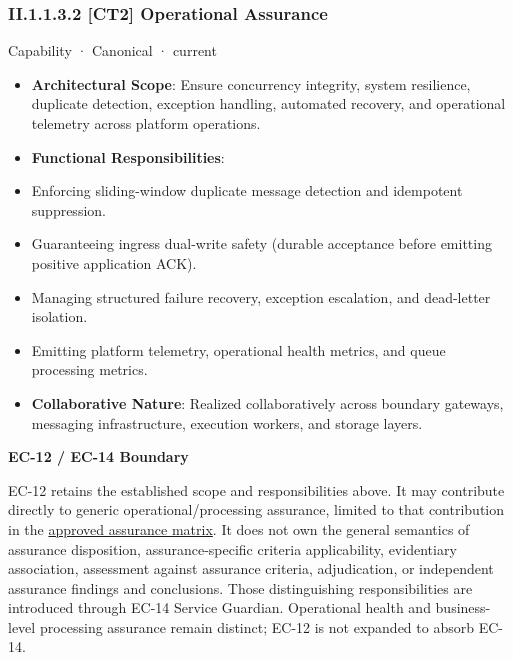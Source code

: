 \subsubsection*{II.1.1.3.2 [CT2] Operational Assurance}
\label{navigation:II.1.1.3.2}

\label{element:938cd44380ab431fa8dae13c702d83c1}
{\small Capability · Canonical · current}\par

\begin{itemize}


\item \textbf{Architectural Scope}: Ensure concurrency integrity, system resilience, duplicate detection, exception handling, automated recovery, and operational telemetry across platform operations.

\item \textbf{Functional Responsibilities}:

\item Enforcing sliding-window duplicate message detection and idempotent suppression.

\item Guaranteeing ingress dual-write safety (durable acceptance before emitting positive application ACK).

\item Managing structured failure recovery, exception escalation, and dead-letter isolation.

\item Emitting platform telemetry, operational health metrics, and queue processing metrics.

\item \textbf{Collaborative Nature}: Realized collaboratively across boundary gateways, messaging infrastructure, execution workers, and storage layers.

\end{itemize}


\par\medskip\textbf{EC-12 / EC-14 Boundary}\par


EC-12 retains the established scope and responsibilities above. It may contribute directly to generic operational/processing assurance, limited to that contribution in the \href{\detokenize{../../../../../../../../docs/markdown/02-strategy/capability-maps/health-service-assurance-derivation.md#collaborative-enterprise-capability-contribution-matrix}}{approved assurance matrix}. It does not own the general semantics of assurance disposition, assurance-specific criteria applicability, evidentiary association, assessment against assurance criteria, adjudication, or independent assurance findings and conclusions. Those distinguishing responsibilities are introduced through EC-14 Service Guardian. Operational health and business-level processing assurance remain distinct; EC-12 is not expanded to absorb EC-14.



